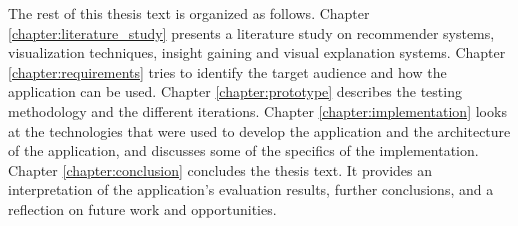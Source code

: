 The rest of this thesis text is organized as follows. Chapter \ref{chapter:literature_study} presents a literature study on recommender systems, visualization techniques, insight gaining and visual explanation systems. Chapter \ref{chapter:requirements} tries to identify the target audience and how the application can be used. Chapter \ref{chapter:prototype} describes the testing methodology and the different iterations. Chapter \ref{chapter:implementation} looks at the technologies that were used to develop the application and the architecture of the application, and discusses some of the specifics of the implementation. Chapter \ref{chapter:conclusion} concludes the thesis text. It provides an interpretation of the application's evaluation results, further conclusions, and a reflection on future work and opportunities.
